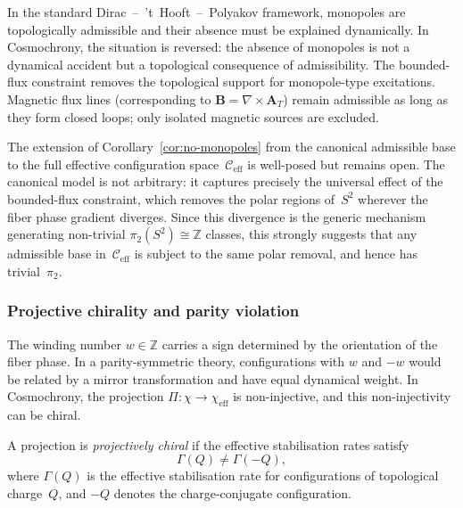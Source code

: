     In the standard Dirac~--~'t~Hooft~--~Polyakov framework, monopoles are
    topologically admissible and their absence must be explained dynamically.
    In Cosmochrony, the situation is reversed: the absence of monopoles is
    not a dynamical accident but a topological consequence of admissibility.
    The bounded-flux constraint removes the topological support for
    monopole-type excitations.
    Magnetic flux lines (corresponding to $\mathbf{B} = \nabla \times \mathbf{A}_T$)
    remain admissible as long as they form closed loops; only isolated magnetic
    sources are excluded.

    The extension of Corollary~\ref{cor:no-monopoles} from the canonical
    admissible base to the full effective configuration space~$\mathcal{C}_{\mathrm{eff}}$
    is well-posed but remains open.
    The canonical model is not arbitrary: it captures precisely the universal
    effect of the bounded-flux constraint, which removes the polar regions of~$S^2$
    wherever the fiber phase gradient diverges.
    Since this divergence is the generic mechanism generating non-trivial
    $\pi_2(S^2) \cong \mathbb{Z}$ classes, this strongly suggests that any
    admissible base in~$\mathcal{C}_{\mathrm{eff}}$ is subject to the same
    polar removal, and hence has trivial~$\pi_2$.

  \subsubsection*{Projective chirality and parity violation}
    \label{sec:projective-chirality}

    The winding number $w \in \mathbb{Z}$ carries a sign determined by the
    orientation of the fiber phase.
    In a parity-symmetric theory, configurations with $w$ and $-w$ would be
    related by a mirror transformation and have equal dynamical weight.
    In Cosmochrony, the projection $\Pi : \chi \to \chi_{\mathrm{eff}}$ is
    non-injective, and this non-injectivity can be chiral.

    \begin{definition}
      \label{def:projective-chirality}
      A projection is \emph{projectively chiral} if the effective
      stabilisation rates satisfy
      \begin{equation}
        \Gamma(Q) \neq \Gamma(-Q),
      \end{equation}
      where $\Gamma(Q)$ is the effective stabilisation rate for configurations
      of topological charge~$Q$, and $-Q$ denotes the charge-conjugate
      configuration.
    \end{definition}

